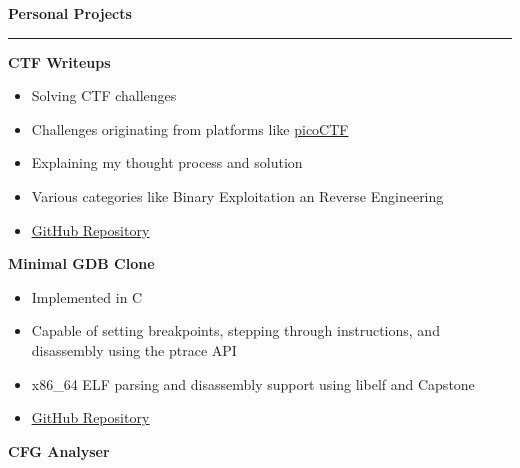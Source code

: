 \documentclass[12pt]{article}
\begin{document}
\vspace{1cm}
{\fontsize{14pt}{13pt}\selectfont
   \textbf{\textcolor{bgcolor}{Personal Projects}}\\[0.3em]
}
\hrule
\vspace{0.5cm}
\textbf{\textcolor{bgcolor}{CTF Writeups}}\\[0.5em]
{\renewcommand{\labelitemi}{\textcolor{bgcolor}{\normalsize$\bullet$}}%
   \begin{itemize}[leftmargin=33pt, itemsep=0pt, topsep=0pt]
      \item Solving CTF challenges\\
      \item Challenges originating from platforms like \href{https://picoctf.org/}{picoCTF}\\
      \item Explaining my thought process and solution\\
      \item Various categories like Binary Exploitation an Reverse Engineering\\
      \item \href{https://github.com/gpaphitis/CTF-Writeups}{\underline{GitHub Repository}}\\
   \end{itemize}
}
\vspace{0.5cm}
\textbf{\textcolor{bgcolor}{Minimal GDB Clone}}\\[0.5em]
{\renewcommand{\labelitemi}{\textcolor{bgcolor}{\normalsize$\bullet$}}%
   \begin{itemize}[leftmargin=33pt, itemsep=0pt, topsep=0pt]
      \item Implemented in C\\
      \item Capable of setting breakpoints, stepping through instructions, and disassembly using the ptrace API\\
      \item x86\_64 ELF parsing and disassembly support using libelf and Capstone\\
      \item \href{https://github.com/gpaphitis/MinimalGDB}{\underline{GitHub Repository}}\\
   \end{itemize}
}
\vspace{0.5cm}
\textbf{\textcolor{bgcolor}{CFG Analyser}}\\[0.5em]
\end{document}
